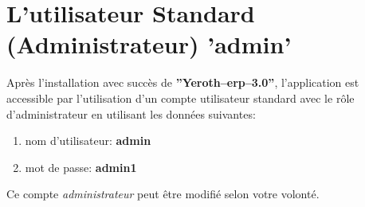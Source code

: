 \documentclass[a4paper, 10pt]{article}
\newcommand{\yerotherptroiszero}{\textbf{''Yeroth--erp--3.0''}\xspace}
\begin{document}
\section{L'utilisateur Standard (Administrateur) 'admin'}

Apr\`es l'installation avec succ\`es de \yerotherptroiszero,
l'application est accessible par l'utilisation
d'un compte utilisateur standard avec le r\^ole
d'administrateur en utilisant les donn\'ees suivantes:\\

\begin{enumerate}[1)]
	\item nom d'utilisateur: \textbf{admin}
	\item mot de passe: \textbf{admin1}\\
\end{enumerate}

Ce compte \emph{administrateur} peut \^etre modifi\'e
selon votre volont\'e.
\end{document}
